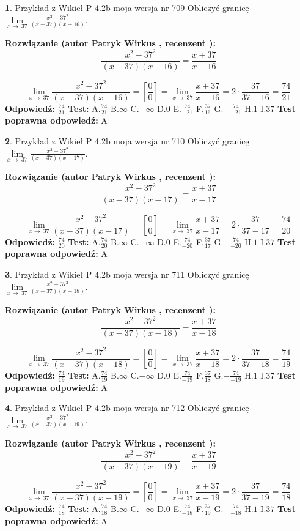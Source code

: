 \documentclass[12pt, a4paper]{article}
\theoremstyle{definition} %
\newtheorem{zad}{}
\newcommand{\zadStart}[1]{\begin{zad}#1\newline}
\newcommand{\zadStop}{\end{zad}}
\newcommand{\rozwStart}[2]{\noindent \textbf{Rozwiązanie (autor #1 , recenzent #2): }\newline}
\newcommand{\rozwStop}{\newline}
\newcommand{\odpStart}{\noindent \textbf{Odpowiedź:}\newline}
\newcommand{\odpStop}{\newline}
\newcommand{\testStart}{\noindent \textbf{Test:}\newline}
\newcommand{\testStop}{\newline}
\newcommand{\kluczStart}{\noindent \textbf{Test poprawna odpowiedź:}\newline}
\newcommand{\kluczStop}{\newline}
\begin{document}
\zadStart{Przykład z Wikieł P 4.2b moja wersja nr 709}
Obliczyć granicę $\lim\limits_{x\to\ 37}\frac{x^{2}-37^{2}}{(x-37)(x-16)}$.
\zadStop
\rozwStart{Patryk Wirkus}{}
$$\frac{x^{2}-37^{2}}{(x-37)(x-16)}=\frac{x+37}{x-16}$$

$$\lim\limits_{x\to\ 37}\frac{x^{2}-37^{2}}{(x-37)(x-16)}=[\frac{0}{0}]=\lim\limits_{x\to\ 37}\frac{x+37}{x-16}=2 \cdot \frac{37}{37-16} = \frac{74}{21}$$
\rozwStop
\odpStart
$\frac{74}{21}$
\odpStop
\testStart
A.$\frac{74}{21}$
B.$\infty$
C.$-\infty$
D.$0$
E.$\frac{74}{-21}$
F.$\frac{37}{16}$
G.$-\frac{74}{-21}$
H.$1$
I.$37$
\testStop
\kluczStart
A
\kluczStop



\zadStart{Przykład z Wikieł P 4.2b moja wersja nr 710}
Obliczyć granicę $\lim\limits_{x\to\ 37}\frac{x^{2}-37^{2}}{(x-37)(x-17)}$.
\zadStop
\rozwStart{Patryk Wirkus}{}
$$\frac{x^{2}-37^{2}}{(x-37)(x-17)}=\frac{x+37}{x-17}$$

$$\lim\limits_{x\to\ 37}\frac{x^{2}-37^{2}}{(x-37)(x-17)}=[\frac{0}{0}]=\lim\limits_{x\to\ 37}\frac{x+37}{x-17}=2 \cdot \frac{37}{37-17} = \frac{74}{20}$$
\rozwStop
\odpStart
$\frac{74}{20}$
\odpStop
\testStart
A.$\frac{74}{20}$
B.$\infty$
C.$-\infty$
D.$0$
E.$\frac{74}{-20}$
F.$\frac{37}{17}$
G.$-\frac{74}{-20}$
H.$1$
I.$37$
\testStop
\kluczStart
A
\kluczStop



\zadStart{Przykład z Wikieł P 4.2b moja wersja nr 711}
Obliczyć granicę $\lim\limits_{x\to\ 37}\frac{x^{2}-37^{2}}{(x-37)(x-18)}$.
\zadStop
\rozwStart{Patryk Wirkus}{}
$$\frac{x^{2}-37^{2}}{(x-37)(x-18)}=\frac{x+37}{x-18}$$

$$\lim\limits_{x\to\ 37}\frac{x^{2}-37^{2}}{(x-37)(x-18)}=[\frac{0}{0}]=\lim\limits_{x\to\ 37}\frac{x+37}{x-18}=2 \cdot \frac{37}{37-18} = \frac{74}{19}$$
\rozwStop
\odpStart
$\frac{74}{19}$
\odpStop
\testStart
A.$\frac{74}{19}$
B.$\infty$
C.$-\infty$
D.$0$
E.$\frac{74}{-19}$
F.$\frac{37}{18}$
G.$-\frac{74}{-19}$
H.$1$
I.$37$
\testStop
\kluczStart
A
\kluczStop



\zadStart{Przykład z Wikieł P 4.2b moja wersja nr 712}
Obliczyć granicę $\lim\limits_{x\to\ 37}\frac{x^{2}-37^{2}}{(x-37)(x-19)}$.
\zadStop
\rozwStart{Patryk Wirkus}{}
$$\frac{x^{2}-37^{2}}{(x-37)(x-19)}=\frac{x+37}{x-19}$$

$$\lim\limits_{x\to\ 37}\frac{x^{2}-37^{2}}{(x-37)(x-19)}=[\frac{0}{0}]=\lim\limits_{x\to\ 37}\frac{x+37}{x-19}=2 \cdot \frac{37}{37-19} = \frac{74}{18}$$
\rozwStop
\odpStart
$\frac{74}{18}$
\odpStop
\testStart
A.$\frac{74}{18}$
B.$\infty$
C.$-\infty$
D.$0$
E.$\frac{74}{-18}$
F.$\frac{37}{19}$
G.$-\frac{74}{-18}$
H.$1$
I.$37$
\testStop
\kluczStart
A
\kluczStop
\end{document}
